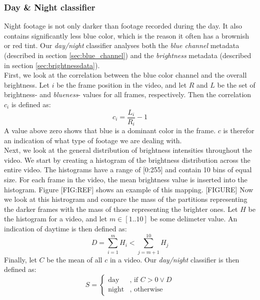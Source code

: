 \subsubsection{Day \& Night classifier}\label{sec:daynightclassifier}
%
Night footage is not only darker than footage recorded during the day. It also contains significantly less blue color, which is the reason it often has a brownish or red tint. Our \textit{day/night} classifier analyses both the \textit{blue channel} metadata (described in section \ref{sec:blue_channel}) and the \textit{brightness} metadata (described in section \ref{sec:brightnessdata}).\\
First, we look at the correlation between the blue color channel and the overall brightness. Let $i$ be the frame position in the video, and let $R$ and $L$ be the set of brightness- and \textit{blueness}- values for all frames, respectively. Then the correlation $c_{i}$ is defined as:\\
%
\begin{equation}
c_{i} = \frac{L_{i}}{R_{i}} - 1
\end{equation}
%
A value above zero shows that blue is a dominant color in the frame. $c$ is therefor an indication of what type of footage we are dealing with.\\
Next, we look at the general distribution of brightness intensities throughout the video. We start by creating a histogram of the brightness distribution across the entire video. The histograms have a range of [0:255] and contain 10 bins of equal size. For each frame in the video, the mean brightness value is inserted into the histogram. Figure [FIG:REF] shows an example of this mapping.
%
[FIGURE]
%
Now we look at this histrogram and compare the mass of the partitions representing the darker frames with the mass of those representing the brighter ones. Let $H$ be the histogram for a video, and let $m\in [1..10]$ be some delimeter value. An indication of daytime is then defined as:
%
\begin{equation}
D = \sum_{i=1}^{m}H_{i} < \sum_{j=m+1}^{10}H_{j}
\end{equation}
%
Finally, let $C$ be the mean of all $c$ in a video. Our \textit{day/night} classifier is then defined as:
\begin{equation}
S =
\begin{cases}
\text{day} & \text{, if } C > 0 \vee D \\
\text{night} &  \text{, otherwise}
\end{cases}
\end{equation}
%
%
